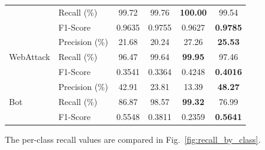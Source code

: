 \documentclass[conference]{IEEEtran}
\begin{document}
\begin{table}[t]
{\begin{tabular}{llcccc}
                            & Recall (\%)    & 99.72 & 99.76 & \textbf{100.00} & 99.54 \\
                            & F1-Score       & 0.9635 & 0.9755 & 0.9627 & \textbf{0.9785} \\
\midrule
\multirow{3}{*}{WebAttack}  & Precision (\%) & 21.68 & 20.24 & 27.26 & \textbf{25.53} \\
                            & Recall (\%)    & 96.47 & 99.64 & \textbf{99.95} & 97.46 \\
                            & F1-Score       & 0.3541 & 0.3364 & 0.4248 & \textbf{0.4016} \\
\midrule
\multirow{3}{*}{Bot}        & Precision (\%) & 42.91 & 23.81 & 13.39 & \textbf{48.27} \\
                            & Recall (\%)    & 86.87 & 98.57 & \textbf{99.32} & 76.99 \\
                            & F1-Score       & 0.5548 & 0.3811 & 0.2359 & \textbf{0.5641} \\
\bottomrule
\end{tabular}%
}
\end{table}

The per-class recall values are compared in Fig.~\ref{fig:recall_by_class}.
\end{document}
